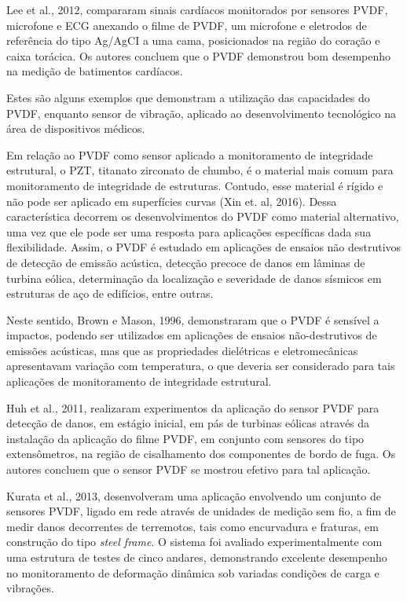 \documentclass[
	12pt,				
	oneside,			
	a4paper,			
	english,			
	brazil,			
	]{abntex2ppgsi}
\begin{document}
Lee et al., 2012, compararam sinais cardíacos monitorados por sensores PVDF, microfone e ECG anexando o filme de PVDF, um microfone e eletrodos de referência do tipo Ag/AgCI a uma cama, posicionados na região do coração e caixa torácica. Os autores concluem que o PVDF demonstrou bom desempenho na medição de batimentos cardíacos. 

Estes são alguns exemplos que demonstram a utilização das capacidades do PVDF, enquanto sensor de vibração, aplicado ao desenvolvimento tecnológico na área de dispositivos médicos.

Em relação ao PVDF como sensor aplicado a monitoramento de integridade estrutural, o PZT, titanato zirconato de chumbo, é o material mais comum para monitoramento de integridade de estruturas. Contudo, esse material é rígido e não pode ser aplicado em superfícies curvas (Xin et. al, 2016). Dessa característica decorrem os desenvolvimentos do PVDF como material alternativo, uma vez que ele pode ser uma resposta para aplicações específicas dada sua flexibilidade. Assim, o PVDF é estudado em aplicações de ensaios não destrutivos de detecção de emissão acústica, detecção precoce de danos em lâminas de turbina eólica, determinação da localização e severidade de danos sísmicos em estruturas de aço de edifícios, entre outras.

Neste sentido, Brown e Mason, 1996, demonstraram que o PVDF é sensível a impactos, podendo ser utilizados em aplicações de ensaios não-destrutivos de emissões acústicas, mas que as propriedades dielétricas e eletromecânicas apresentavam variação com temperatura, o que deveria ser considerado para tais aplicações de monitoramento de integridade estrutural. 


Huh et al., 2011, realizaram experimentos da aplicação do sensor PVDF para detecção de danos, em estágio inicial, em pás de turbinas eólicas através da instalação da aplicação do filme PVDF, em conjunto com sensores do tipo extensômetros, na região de cisalhamento dos componentes de bordo de fuga. Os autores concluem que o sensor PVDF se mostrou efetivo para tal aplicação.

Kurata et al., 2013, desenvolveram uma aplicação envolvendo um conjunto de sensores PVDF, ligado em rede através de unidades de medição sem fio, a fim  de medir danos decorrentes de terremotos, tais como encurvadura e fraturas, em construção do tipo \textit{steel frame}. O sistema foi avaliado experimentalmente com uma estrutura de testes de cinco andares, demonstrando excelente desempenho no monitoramento de deformação dinâmica sob variadas condições de carga e vibrações.
\end{document}

